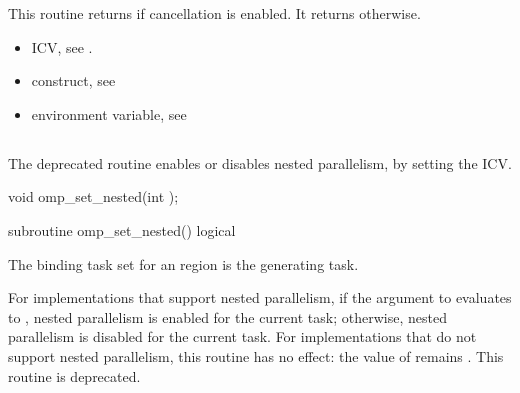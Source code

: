 \effect
This routine returns  if cancellation is enabled. It returns  otherwise.

\crossreferences
\begin{itemize}
\item {} ICV, see 
.

\item {} construct, see 

\item {} environment variable, see 
\end{itemize}









\subsection{}
\label{subsec:omp_set_nested}
\summary
The deprecated  routine enables or disables nested parallelism, by setting the 
 ICV. 

\format
\begin{ccppspecific}
\begin{boxedcode}
void omp\_set\_nested(int );
\end{boxedcode}
\end{ccppspecific}

\begin{fortranspecific}
\begin{boxedcode}
subroutine omp\_set\_nested()
logical 
\end{boxedcode}
\end{fortranspecific}

\binding
The binding task set for an  region is the generating task. 

\effect
For implementations that support nested parallelism, if the argument to 
 evaluates to , nested parallelism is enabled for the current task; 
otherwise, nested parallelism is disabled for the current task. For implementations that 
do not support nested parallelism, this routine has no effect: the value of  
remains . This routine is deprecated.


